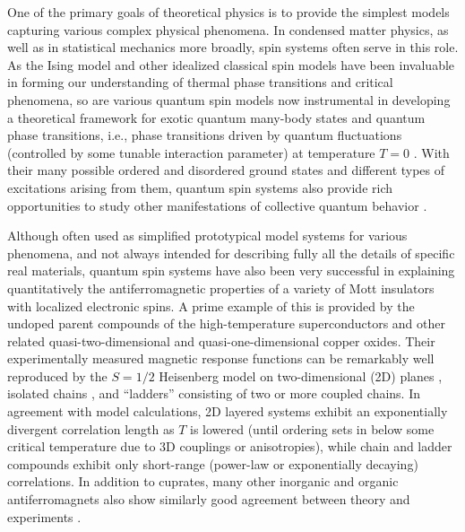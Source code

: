 \documentclass[draft,numberedheadings]{aipproc}
\begin{document}
One of the primary goals of theoretical physics is to provide the simplest models capturing various complex physical
phenomena. In condensed matter physics, as well as in statistical mechanics more broadly, spin systems often 
serve in this role. As the Ising model and other idealized classical spin models have been invaluable in forming our understanding 
of thermal phase transitions and critical phenomena, so are various quantum spin models now instrumental in developing a theoretical 
framework for exotic quantum many-body states and quantum phase transitions, i.e., phase transitions driven by quantum fluctuations 
(controlled by some tunable interaction parameter) at temperature $T=0$ \cite{sachdevbook,sachdev1}. With their many possible ordered and 
disordered ground states and different types of excitations arising from them, quantum spin systems also provide rich opportunities to 
study other manifestations of collective quantum behavior \cite{sachdev2,auerbachbook}.

Although often used as simplified prototypical model systems for various phenomena, and not always intended for describing 
fully all the details of specific real materials, quantum spin systems have also been very successful in explaining quantitatively 
the antiferromagnetic properties of a variety of Mott insulators with localized electronic spins. A prime example of this is provided 
by the undoped parent compounds of the high-temperature superconductors and other related quasi-two-dimensional and quasi-one-dimensional 
copper oxides. Their experimentally measured magnetic response functions can be remarkably well reproduced by the $S=1/2$ Heisenberg 
model on two-dimensional (2D) planes \cite{chn,manousakis}, isolated chains \cite{eggert94,eggert96}, and ``ladders'' \cite{dagotto1} 
consisting of two or more coupled chains. In agreement with model calculations, 2D layered systems exhibit an exponentially divergent correlation 
length as $T$ is lowered (until ordering sets in below some critical temperature due to 3D couplings or anisotropies), while chain and ladder
compounds exhibit only short-range (power-law or exponentially decaying) correlations. In addition to cuprates, many other inorganic and organic 
antiferromagnets also show similarly good agreement between theory and experiments \cite{miller}. 
\end{document}
